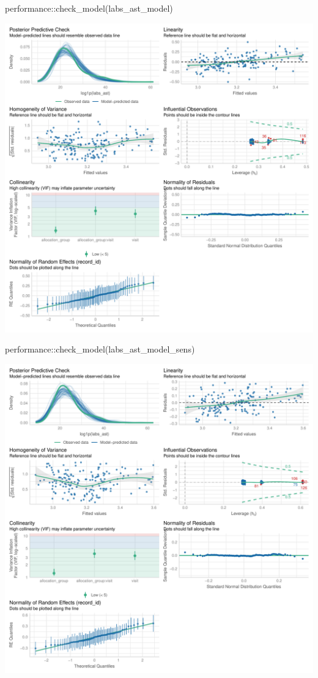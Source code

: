 \documentclass[
  12pt,
]{article}
\newenvironment{Shaded}{\begin{snugshade}}{\end{snugshade}}
\newcommand{\FunctionTok}[1]{\textcolor[rgb]{0.28,0.35,0.67}{#1}}
\newcommand{\NormalTok}[1]{\textcolor[rgb]{0.00,0.23,0.31}{#1}}
\newcommand{\SpecialCharTok}[1]{\textcolor[rgb]{0.37,0.37,0.37}{#1}}
\begin{document}
\begin{Shaded}
\begin{Highlighting}[]
\NormalTok{performance}\SpecialCharTok{::}\FunctionTok{check\_model}\NormalTok{(labs\_ast\_model) }
\end{Highlighting}
\end{Shaded}

\includegraphics{Outcomes_files/figure-pdf/labs_ast_4-1.pdf}

\begin{Shaded}
\begin{Highlighting}[]
\NormalTok{performance}\SpecialCharTok{::}\FunctionTok{check\_model}\NormalTok{(labs\_ast\_model\_sens)}
\end{Highlighting}
\end{Shaded}

\includegraphics{Outcomes_files/figure-pdf/labs_ast_4-2.pdf}
\end{document}
